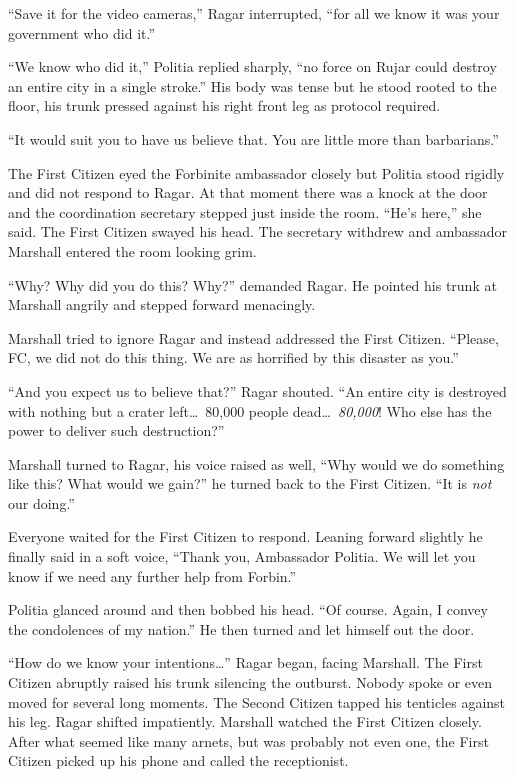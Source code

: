 ``Save it for the video cameras,'' Ragar interrupted, ``for all we know it was your government
who did it.''

``We know who did it,'' Politia replied sharply, ``no force on Rujar could destroy an entire
city in a single stroke.'' His body was tense but he stood rooted to the floor, his trunk
pressed against his right front leg as protocol required.

``It would suit you to have us believe that. You are little more than barbarians.''

The First Citizen eyed the Forbinite ambassador closely but Politia stood rigidly and did not
respond to Ragar. At that moment there was a knock at the door and the coordination secretary
stepped just inside the room. ``He's here,'' she said. The First Citizen swayed his head. The
secretary withdrew and ambassador Marshall entered the room looking grim.

``Why? Why did you do this? Why?'' demanded Ragar. He pointed his trunk at Marshall angrily and
stepped forward menacingly.

Marshall tried to ignore Ragar and instead addressed the First Citizen. ``Please, FC, we did not
do this thing. We are as horrified by this disaster as you.''

``And you expect us to believe that?'' Ragar shouted. ``An entire city is destroyed with nothing
but a crater left\ldots\ 80,000 people dead\ldots\ \emph{80,000}! Who else has the power to
deliver such destruction?''

Marshall turned to Ragar, his voice raised as well, ``Why would we do something like this? What
would we gain?'' he turned back to the First Citizen. ``It is \emph{not} our doing.''

Everyone waited for the First Citizen to respond. Leaning forward slightly he finally said in a
soft voice, ``Thank you, Ambassador Politia. We will let you know if we need any further help
from Forbin.''

Politia glanced around and then bobbed his head. ``Of course. Again, I convey the condolences of
my nation.'' He then turned and let himself out the door.

``How do we know your intentions\ldots'' Ragar began, facing Marshall. The First Citizen
abruptly raised his trunk silencing the outburst. Nobody spoke or even moved for several long
moments. The Second Citizen tapped his tenticles against his leg. Ragar shifted impatiently.
Marshall watched the First Citizen closely. After what seemed like many arnets, but was probably
not even one, the First Citizen picked up his phone and called the receptionist.

